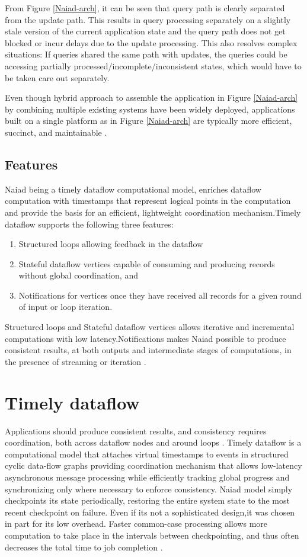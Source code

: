 \documentclass[9pt,twocolumn,twoside]{../../styles/osajnl}
\begin{document}
From Figure \ref{Naiad-arch}, it can be seen that query path is
clearly separated from the update path. This results in query
processing separately on a slightly stale version of the current
application state and the query path does not get blocked or incur
delays due to the update processing. This also resolves complex
situations: If queries shared the same path with updates, the queries
could be accessing partially processed/incomplete/inconsistent states,
which would have to be taken care out separately.

Even though hybrid approach to assemble the application in Figure
\ref{Naiad-arch} by combining multiple existing systems have been
widely deployed, applications built on a single platform as in Figure
\ref{Naiad-arch} are typically more efficient, succinct, and
maintainable \cite{paper1-Naiad}.

\subsection{Features} 
Naiad being a timely dataflow computational model, enriches dataflow
computation with timestamps that represent logical points in the
computation and provide the basis for an efficient, lightweight
coordination mechanism.Timely dataflow supports the following three
features:

\begin{enumerate}
\item Structured loops allowing feedback in the dataflow
\item Stateful dataflow vertices capable of consuming and producing
  records without global coordination, and
\item Notifications for vertices once they have received all records
  for a given round of input or loop iteration.
\end{enumerate}

Structured loops and Stateful dataflow vertices allows iterative and
incremental computations with low latency.Notifications makes Naiad
possible to produce consistent results, at both outputs and
intermediate stages of computations, in the presence of streaming or
iteration \cite{paper1-Naiad}.

\section{Timely dataflow}
Applications should produce consistent results, and consistency
requires coordination, both across dataflow nodes and around loops
\cite{paper1-Naiad}. Timely dataflow is a computational model that
attaches virtual timestamps to events in structured cyclic data-flow
graphs providing coordination mechanism that allows low-latency
asynchronous message processing while efficiently tracking global
progress and synchronizing only where necessary to enforce
consistency. Naiad model simply checkpoints its state periodically,
restoring the entire system state to the most recent checkpoint on
failure. Even if its not a sophisticated design,it was chosen in part
for its low overhead. Faster common-case processing allows more
computation to take place in the intervals between checkpointing, and
thus often decreases the total time to job completion
\cite{paper3-Naiad}.
\end{document}
